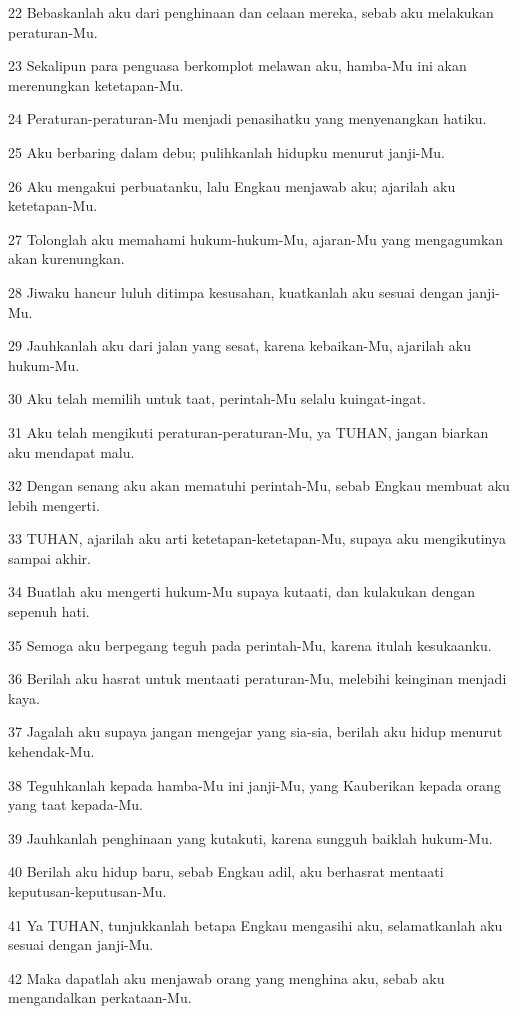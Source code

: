 \par 22 Bebaskanlah aku dari penghinaan dan celaan mereka, sebab aku melakukan peraturan-Mu.
\par 23 Sekalipun para penguasa berkomplot melawan aku, hamba-Mu ini akan merenungkan ketetapan-Mu.
\par 24 Peraturan-peraturan-Mu menjadi penasihatku yang menyenangkan hatiku.
\par 25 Aku berbaring dalam debu; pulihkanlah hidupku menurut janji-Mu.
\par 26 Aku mengakui perbuatanku, lalu Engkau menjawab aku; ajarilah aku ketetapan-Mu.
\par 27 Tolonglah aku memahami hukum-hukum-Mu, ajaran-Mu yang mengagumkan akan kurenungkan.
\par 28 Jiwaku hancur luluh ditimpa kesusahan, kuatkanlah aku sesuai dengan janji-Mu.
\par 29 Jauhkanlah aku dari jalan yang sesat, karena kebaikan-Mu, ajarilah aku hukum-Mu.
\par 30 Aku telah memilih untuk taat, perintah-Mu selalu kuingat-ingat.
\par 31 Aku telah mengikuti peraturan-peraturan-Mu, ya TUHAN, jangan biarkan aku mendapat malu.
\par 32 Dengan senang aku akan mematuhi perintah-Mu, sebab Engkau membuat aku lebih mengerti.
\par 33 TUHAN, ajarilah aku arti ketetapan-ketetapan-Mu, supaya aku mengikutinya sampai akhir.
\par 34 Buatlah aku mengerti hukum-Mu supaya kutaati, dan kulakukan dengan sepenuh hati.
\par 35 Semoga aku berpegang teguh pada perintah-Mu, karena itulah kesukaanku.
\par 36 Berilah aku hasrat untuk mentaati peraturan-Mu, melebihi keinginan menjadi kaya.
\par 37 Jagalah aku supaya jangan mengejar yang sia-sia, berilah aku hidup menurut kehendak-Mu.
\par 38 Teguhkanlah kepada hamba-Mu ini janji-Mu, yang Kauberikan kepada orang yang taat kepada-Mu.
\par 39 Jauhkanlah penghinaan yang kutakuti, karena sungguh baiklah hukum-Mu.
\par 40 Berilah aku hidup baru, sebab Engkau adil, aku berhasrat mentaati keputusan-keputusan-Mu.
\par 41 Ya TUHAN, tunjukkanlah betapa Engkau mengasihi aku, selamatkanlah aku sesuai dengan janji-Mu.
\par 42 Maka dapatlah aku menjawab orang yang menghina aku, sebab aku mengandalkan perkataan-Mu.
